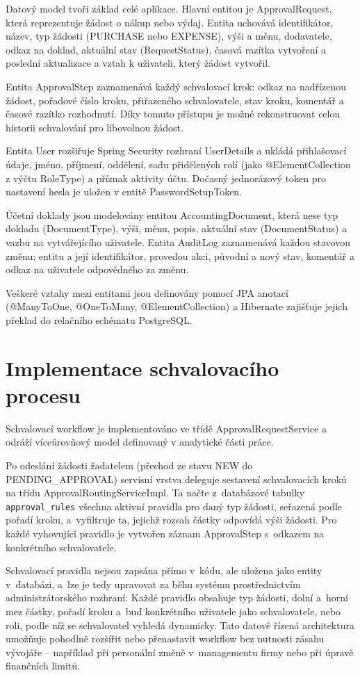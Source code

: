 Datový model tvoří základ celé aplikace. Hlavní entitou je ApprovalRequest, která reprezentuje žádost o nákup nebo výdaj. Entita uchovává identifikátor, název, typ žádosti (PURCHASE nebo EXPENSE), výši a měnu, dodavatele, odkaz na doklad, aktuální stav (RequestStatus), časová razítka vytvoření a poslední aktualizace a vztah k uživateli, který žádost vytvořil.

Entita ApprovalStep zaznamenává každý schvalovací krok: odkaz na nadřízenou žádost, pořadové číslo kroku, přiřazeného schvalovatele, stav kroku, komentář a časové razítko rozhodnutí. Díky tomuto přístupu je možné rekonstruovat celou historii schvalování pro libovolnou žádost.

Entita User rozšiřuje Spring Security rozhraní UserDetails a ukládá přihlašovací údaje, jméno, příjmení, oddělení, sadu přidělených rolí (jako @ElementCollection z výčtu RoleType) a příznak aktivity účtu. Dočasný jednorázový token pro nastavení hesla je uložen v entitě PasswordSetupToken.

Účetní doklady jsou modelovány entitou AccountingDocument, která nese typ dokladu (DocumentType), výši, měnu, popis, aktuální stav (DocumentStatus) a vazbu na vytvářejícího uživatele. Entita AuditLog zaznamenává každou stavovou změnu: entitu a její identifikátor, provedou akci, původní a nový stav, komentář a odkaz na uživatele odpovědného za změnu.

Veškeré vztahy mezi entitami jsou definovány pomocí JPA anotací (@ManyToOne, @OneToMany, @ElementCollection) a Hibernate zajišťuje jejich překlad do relačního schématu PostgreSQL.


\section{Implementace schvalovacího procesu}

Schvalovací workflow je implementováno ve třídě ApprovalRequestService a odráží víceúrovňový model definovaný v analytické části práce.

Po odeslání žádosti žadatelem (přechod ze stavu NEW do PENDING\_APPROVAL) servisní vrstva deleguje sestavení schvalovacích kroků na třídu ApprovalRoutingServiceImpl. Ta načte z~databázové tabulky \texttt{approval\_rules} všechna aktivní pravidla pro daný typ žádosti, seřazená podle pořadí kroku, a~vyfiltruje ta, jejichž rozsah částky odpovídá výši žádosti. Pro každé vyhovující pravidlo je vytvořen záznam ApprovalStep s~odkazem na konkrétního schvalovatele.

Schvalovací pravidla nejsou zapsána přímo v~kódu, ale uložena jako entity v~databázi, a~lze je tedy upravovat za běhu systému prostřednictvím administrátorského rozhraní. Každé pravidlo obsahuje typ žádosti, dolní a~horní mez částky, pořadí kroku a~buď konkrétního uživatele jako schvalovatele, nebo roli, podle níž se schvalovatel vyhledá dynamicky. Tato datově řízená architektura umožňuje pohodlně rozšířit nebo přenastavit workflow bez nutnosti zásahu vývojáře -- například při personální změně v~managementu firmy nebo při úpravě finančních limitů.

